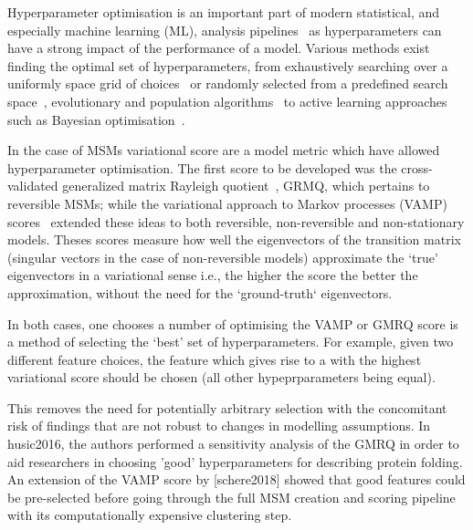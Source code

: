 \documentclass[journal=jacsat,manuscript=article]{achemso}
\begin{document}
Hyperparameter optimisation is an important part of modern statistical, and especially machine learning (ML),  analysis pipelines~\cite{feurer2019hyperparameter, bergstra_jamesbergstra_random_2012, bergstra_making_2013, bergstraAlgorithmsHyperParameterOptimizationa} as hyperparameters can have a strong impact of the performance of a model. Various methods exist finding the optimal set of hyperparameters, from exhaustively searching over a uniformly space grid of choices~\cite{c1997montgomery} or randomly selected from a predefined search space~\cite{bergstra_jamesbergstra_random_2012}, evolutionary and population algorithms~\cite{simon2013evolutionary, kennedyParticleSwarmOptimization1995, eberhart1998comparison, hansenCMAEvolutionStrategy2016} to active learning approaches such as Bayesian optimisation~\cite{hutterSequentialModelbasedOptimization2011, bergstraAlgorithmsHyperParameterOptimizationa, NIPS2012_4522, bergstraMakingScienceModel2013}.

In the case of MSMs variational score are a model metric which have allowed hyperparameter optimisation. The first score to be developed was the cross-validated generalized matrix Rayleigh quotient~\cite{mcgibbonVariationalCrossvalidationSlow2015}, GRMQ, which pertains to reversible MSMs; while the variational approach to Markov processes (VAMP) scores~\cite{wuVariationalApproachLearning2020c,scherer_variational_2019} extended these ideas to both reversible, non-reversible and non-stationary models. Theses scores measure how well the eigenvectors of the transition matrix (singular vectors in the case of non-reversible models) approximate the `true' eigenvectors in a variational sense i.e., the higher the score the better the approximation, without the need for the `ground-truth` eigenvectors.   

In both cases, one chooses a number of  optimising the VAMP or GMRQ score is a method of selecting the `best' set of hyperparameters. For example, given two different feature choices, the feature which gives rise to a with the highest variational score should be chosen (all other hypeprparameters being equal).  

This removes the need for potentially arbitrary selection with the concomitant risk of findings that are not robust to changes in modelling assumptions. In husic2016, the authors performed a sensitivity analysis of the GMRQ  in order to aid researchers in choosing 'good' hyperparameters for describing protein folding.  An extension of the VAMP score by [schere2018] showed that  good features could be pre-selected before going through the full MSM creation and scoring pipeline with its computationally expensive clustering step.  
\end{document}
